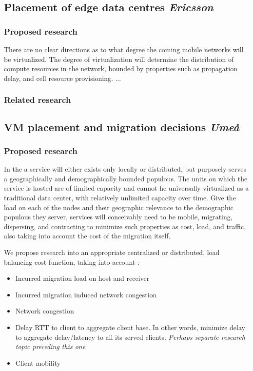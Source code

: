 \subsection{Placement of edge data centres \emph{Ericsson}}
\subsubsection{Proposed research}
There are no clear directions as to what degree the coming mobile networks will be virtualized. The degree of virtualization will determine the distribution of compute resources in the network, bounded by properties such as propagation delay, and cell resource provisioning. ...
\subsubsection{Related research}


\subsection{VM placement and migration decisions \emph{Umeå}}
\subsubsection{Proposed research}
In the \xcloud a service will either exists only locally or distributed, but purposely serves a geographically and demographically bounded populous. The units on which the service is hosted are of limited capacity and cannot he universally virtualized as a traditional data center, with relatively unlimited capacity over time. Give the load on each of the nodes and their geographic relevance to the demographic populous they server, services will conceivably need to be mobile, migrating, dispersing, and contracting to minimize such properties as cost, load, and traffic, also taking into account the cost of the migration itself.

We propose research into an appropriate centralized or distributed, load balancing cost function, taking into account :

\begin{itemize}
\item Incurred migration load on host and receiver
\item Incurred migration induced network congestion
\item Network congestion
\item Delay \/ RTT to client to aggregate client base. In other words, minimize delay to aggregate delay/latency to all its served clients. \emph{Perhaps separate research topic preceding this one}
\item Client mobility
\end{itemize}

